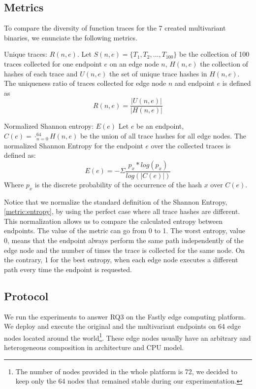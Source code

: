 \subsection{Metrics}

To compare the diversity of function traces for the 7 created multivariant binaries, we enunciate the following metrics.  


\begin{metric}{Unique traces: $R(n, e)$.}\label{metric:ratio:mve}
    Let $S(n, e)=\{T_1, T_2, ..., T_{100}\}$ be the collection of 100 traces collected for one endpoint $e$ on an edge node $n$, $H(n, e)$ the collection of hashes of each trace and $U(n, e)$ the set of unique trace hashes in $H(n,e)$.
    The uniqueness ratio of traces collected for edge node $n$ and endpoint $e$ is defined as
    $$
        R(n,e) = \frac{|U(n,e)|}{|H(n, e)|}
    $$
\end{metric}


\begin{metric}{Normalized Shannon entropy: $E(e)$}\label{metric:entropy}
    Let $e$ be an endpoint, $C(e)=\cdot_{n=0}^{64} H(n, e)$ be the union  of all trace hashes for all edge nodes.
    The normalized Shannon Entropy for the endpoint $e$ over the collected traces is defined as: \\
    $$
        E(e)=-\Sigma \frac{p_x*log(p_x)}{log(|C(e)|)}
    $$
    Where $p_x$ is the discrete probability of the occurrence of the hash $x$ over $C(e)$.
    
\end{metric}

Notice that we normalize the standard definition of the Shannon Entropy, \autoref{metric:entropy}, by using the perfect case where all trace hashes are different. 
This normalization allows us to compare the calculated entropy between endpoints.
The value of the metric can go from 0 to 1. The worst entropy, value 0, means that the endpoint always perform the same path independently of the edge node and the number of times the trace is collected for the same node. On the contrary, 1 for the best entropy, when each edge node executes a different path every time the endpoint is requested.

\subsection{Protocol}


We run the experiments to answer RQ3 on the Fastly edge computing platform. We deploy and execute the original and the multivariant endpoints on 64 edge nodes located around the world\footnote{The number of nodes provided in the whole platform is 72, we decided to keep only the 64 nodes that remained stable during our experimentation.}.
These edge nodes usually have an arbitrary and heterogeneous composition in architecture and CPU model.


